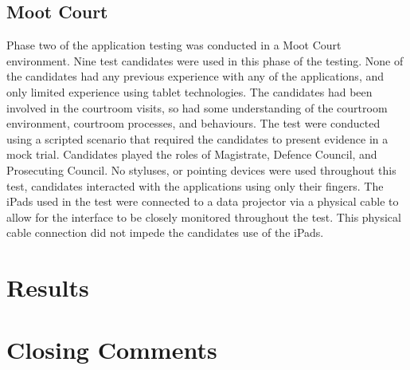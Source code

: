 \documentclass{article}
\begin{document}
\subsection{Moot Court}
Phase two of the application testing was conducted in a Moot Court environment. Nine test candidates were used in this phase of the testing. None of the candidates had any previous experience with any of the applications, and only limited experience using tablet technologies. The candidates had been involved in the courtroom visits, so had some understanding of the courtroom environment, courtroom processes, and behaviours. The test were conducted using a scripted scenario that required the candidates to present evidence in a mock trial. Candidates played the roles of Magistrate, Defence Council, and Prosecuting Council. No styluses, or pointing devices were used throughout this test, candidates interacted with the applications using only their fingers. The iPads used in the test were connected to a data projector via a physical cable to allow for the interface to be closely monitored throughout the test. This physical cable connection did not impede the candidates use of the iPads.

\section{Results}


\section{Closing Comments}
\end{document}

